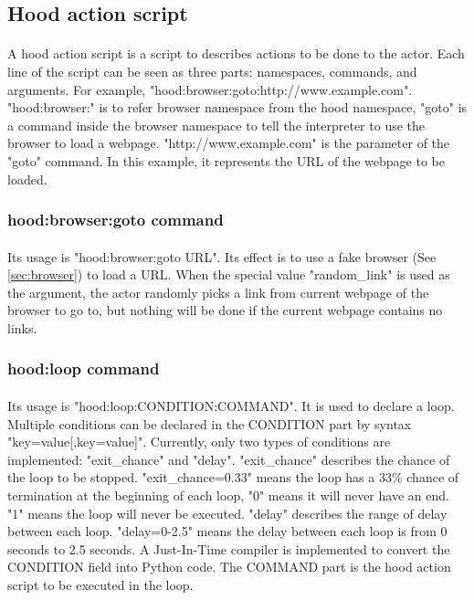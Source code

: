 \documentclass[mscthesis]{usiinfthesis}
\begin{document}
\subsection{Hood action script}
\paragraph{}
A hood action script is a script to describes actions to be done to the actor. Each line of the script can be seen as three parts: namespaces, commands, and arguments. For example, \newline "hood:browser:goto:http://www.example.com". "hood:browser:" is to refer browser namespace from the hood namespace, "goto" is a command inside the browser namespace to tell the interpreter to use the browser to load a webpage. "http://www.example.com" is the parameter of the "goto" command. In this example, it represents the URL of the webpage to be loaded.
\subsubsection{hood:browser:goto command}
\paragraph{}
Its usage is "hood:browser:goto URL". Its effect is to use a fake browser (See \cref{sec:browser}) to load a URL. When the special value "random\_link" is used as the argument, the actor randomly picks a link from current webpage of the browser to go to, but nothing will be done if the current webpage contains no links.
\subsubsection{hood:loop command}
\paragraph{}
Its usage is "hood:loop:CONDITION:COMMAND". It is used to declare a loop. Multiple conditions can be declared in the CONDITION part by syntax "key=value[,key=value]". Currently, only two types of conditions are implemented: "exit\_chance" and "delay". "exit\_chance" describes the chance of the loop to be stopped. "exit\_chance=0.33" means the loop has a 33\% chance of termination at the beginning of each loop, "0" means it will never have an end. "1" means the loop will never be executed. "delay" describes the range of delay between each loop. "delay=0-2.5" means the delay between each loop is from 0 seconds to 2.5 seconds. A Just-In-Time compiler is implemented to convert the CONDITION field into Python code. The COMMAND part is the hood action script to be executed in the loop.
\end{document}
